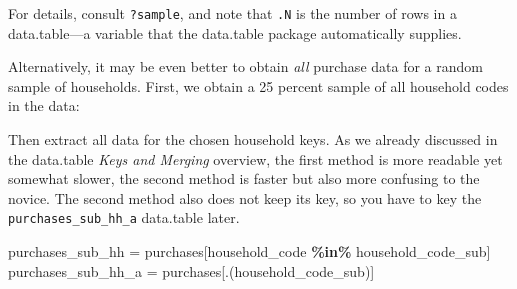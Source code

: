 \documentclass[
]{article}
\newenvironment{Shaded}{\begin{snugshade}}{\end{snugshade}}
\newcommand{\FloatTok}[1]{\textcolor[rgb]{0.00,0.00,0.81}{#1}}
\newcommand{\FunctionTok}[1]{\textcolor[rgb]{0.13,0.29,0.53}{\textbf{#1}}}
\newcommand{\NormalTok}[1]{#1}
\newcommand{\OtherTok}[1]{\textcolor[rgb]{0.56,0.35,0.01}{#1}}
\newcommand{\SpecialCharTok}[1]{\textcolor[rgb]{0.81,0.36,0.00}{\textbf{#1}}}
\begin{document}
For details, consult \texttt{?sample}, and note that \texttt{.N} is the
number of rows in a data.table---a variable that the data.table package
automatically supplies.

Alternatively, it may be even better to obtain \emph{all} purchase data
for a random sample of households. First, we obtain a 25 percent sample
of all household codes in the data:

\begin{Shaded}
\end{Shaded}

Then extract all data for the chosen household keys. As we already
discussed in the data.table \emph{Keys and Merging} overview, the first
method is more readable yet somewhat slower, the second method is faster
but also more confusing to the novice. The second method also does not
keep its key, so you have to key the \texttt{purchases\_sub\_hh\_a}
data.table later.

\begin{Shaded}
\begin{Highlighting}[]
\NormalTok{purchases\_sub\_hh   }\OtherTok{=}\NormalTok{ purchases[household\_code }\SpecialCharTok{\%in\%}\NormalTok{ household\_code\_sub]}
\NormalTok{purchases\_sub\_hh\_a }\OtherTok{=}\NormalTok{ purchases[.(household\_code\_sub)]}
\end{Highlighting}
\end{Shaded}
\end{document}
